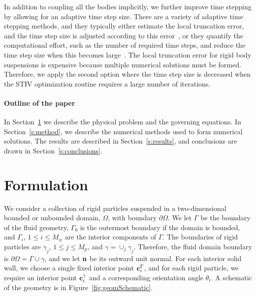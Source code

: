 \documentclass[AMA,STIX1COL]{WileyNJD-v2}
\begin{document}
In addition to coupling all the bodies implicitly, we further improve
time stepping by allowing for an adaptive time step size.  There are a
variety of adaptive time stepping methods, and they typically either
estimate the local truncation error, and the time step size is adjusted
according to this error~\cite{Quaife2015, Quaife2015a, Sorgentone2018},
or they quantify the computational effort, such as the number of
required time steps, and reduce the time step size when this becomes
large~\cite{Kropinski1999}.  The local truncation error for rigid body
suspensions is expensive because multiple numerical solutions must be
formed.  Therefore, we apply the second option where the time step size
is decreased when the STIV optimization routine requires a large number
of iterations.

\paragraph{Outline of the paper}
In Section~\ref{s:formulation} we describe the physical problem and the
governing equations.  In Section~\ref{s:method}, we describe the
numerical methods used to form numerical solutions.
The results are described in Section~\ref{s:results}, and conclusions
are drawn in Section~\ref{s:conclusions}.

\section{Formulation}\label{s:formulation} 
We consider a collection of rigid particles suspended in a
two-dimensional bounded or unbounded domain, $\Omega$, with boundary
$\partial\Omega$. We let $\Gamma$ be the boundary of the fluid geometry,
$\Gamma_0$ is the outermost boundary if the domain is bounded, and
$\Gamma_i$, $1\leq i \leq M_w$ are the interior components of $\Gamma$.
The boundaries of rigid particles are $\gamma_j$, $1\leq j\leq M_p$, and
$\gamma = \cup_{j} \gamma_j$. Therefore, the fluid domain boundary is
$\partial\Omega =\Gamma \cup \gamma$, and we let ${\mathbf{n}}$ be its outward
unit normal.  For each interior solid wall, we choose a single fixed
interior point ${\mathbf{c}}^\Gamma_i$, and for each rigid particle, we require
an interior point ${\mathbf{c}}^\gamma_i$ and a corresponding orientation angle
$\theta_i$.  A schematic of the geometry is in
Figure~\ref{fig:geomSchematic}.
\end{document}
